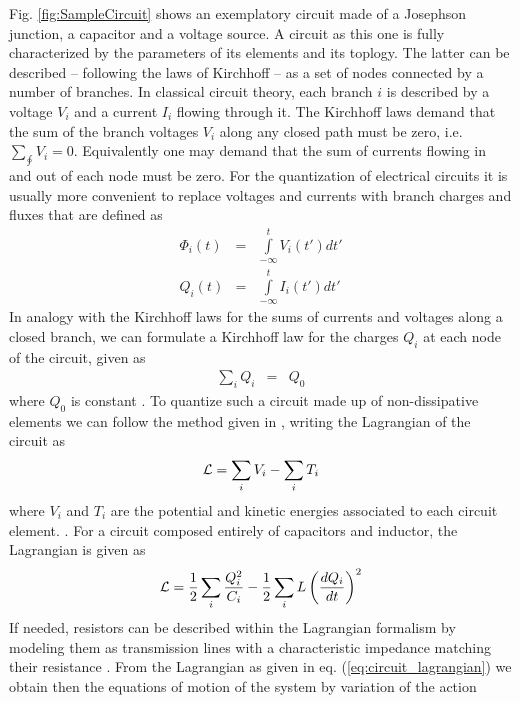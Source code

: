 Fig. \ref{fig:SampleCircuit} shows an exemplatory circuit made of a Josephson junction, a capacitor and a voltage source. A circuit as this one is fully characterized by the parameters of its elements and its toplogy. The latter can be described -- following the laws of Kirchhoff -- as a set of nodes connected by a number of branches. In classical circuit theory, each branch $i$ is described by a voltage $V_i$ and a current $I_{i}$ flowing through it. The Kirchhoff laws demand that the sum of the branch voltages $V_i$ along any closed path must be zero, i.e. $\sum\limits_{\oint} V_i = 0$. Equivalently one may demand that the sum of currents flowing in and out of each node must be zero. For the quantization of electrical circuits it is usually more convenient to replace voltages and currents with branch charges and fluxes that are defined as
%
\begin{eqnarray}
\Phi_i(t) & = & \int\limits_{-\infty}^t V_i(t') dt' \\
Q_i(t) & = & \int\limits_{-\infty}^t I_i(t') dt'
\end{eqnarray}
%
In analogy with the Kirchhoff laws for the sums of currents and voltages along a closed branch, we can formulate a Kirchhoff law for the charges $Q_i$ at each node of the circuit, given as
%
\begin{eqnarray}
\sum\limits_{i} Q_i & = & Q_0 \label{eq:kirchhoff_charge}
\end{eqnarray}
%
where $Q_0$ is constant . To quantize such a circuit made up of non-dissipative elements we can follow the method given in \cite{yurke_quantum_1984}, writing the Lagrangian of the circuit as 
%
\begin{equation}
\begin{mathcal}L\end{mathcal} = \sum\limits_i V_i - \sum\limits_i T_i
\end{equation}
%
where $V_i$ and $T_i$ are the potential and kinetic energies associated to each circuit element. . For a circuit composed entirely of capacitors and inductor, the Lagrangian is given as
%
\begin{equation}
\begin{mathcal}L\end{mathcal} = \frac{1}{2}\sum\limits_i \frac{Q_i^2}{C_i}-\frac{1}{2}\sum\limits_i L \left( \frac{dQ_i}{dt}\right)^2 \label{eq:circuit_lagrangian}
\end{equation}
%
If needed, resistors can be described within the Lagrangian formalism by modeling them as transmission lines with a characteristic impedance matching their resistance \citep{yurke_quantum_1984}. From the Lagrangian as given in eq. (\ref{eq:circuit_lagrangian}) we obtain then the equations of motion of the system by variation of the action
